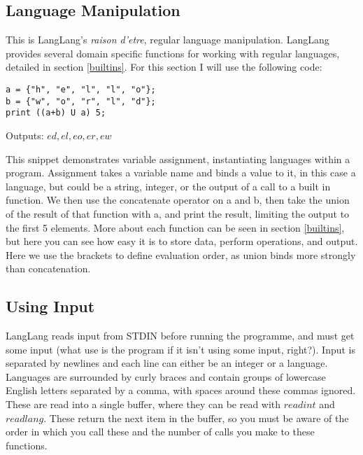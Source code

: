 \subsection{Language Manipulation}
\begin{normalsize}
This is LangLang's \textit{raison d'etre}, regular language manipulation. LangLang provides several domain specific functions for working with regular languages, detailed in section \ref{builtins}. For this section I will use the following code:
\begin{center}
\begin{minipage}{8cm}
\begin{verbatim}
a = {"h", "e", "l", "l", "o"};
b = {"w", "o", "r", "l", "d"};
print ((a+b) U a) 5;
\end{verbatim}
\end{minipage}
\end{center}
Outputs: ${ed, el, eo, er, ew}$

This snippet demonstrates variable assignment, instantiating languages within a program. Assignment takes a variable name and binds a value to it, in this case a language, but could be a string, integer, or the output of a call to a built in function. We then use the concatenate operator on a and b, then take the union of the result of that function with a, and print the result, limiting the output to the first 5 elements. More about each function can be seen in section \ref{builtins}, but here you can see how easy it is to store data, perform operations, and output. Here we use the brackets to define evaluation order, as union binds more strongly than concatenation.
\end{normalsize}

\subsection{Using Input}
\label{input}
\begin{normalsize}
LangLang reads input from STDIN before running the programme, and must get some input (what use is the program if it isn't using some input, right?). Input is separated by newlines and each line can either be an integer or a language. Languages are surrounded by curly braces and contain groups of lowercase English letters separated by a comma, with spaces around these commas ignored. These are read into a single buffer, where they can be read with $readint$ and $readlang$. These return the next item in the buffer, so you must be aware of the order in which you call these and the number of calls you make to these functions.
\end{normalsize}